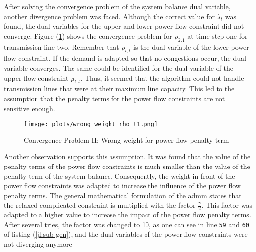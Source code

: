 After solving the convergence problem of the system balance dual variable, another divergence problem was faced. Although the correct value for $\lambda_t$ was found, the dual variables for the upper and lower power flow constraint did not converge. Figure (\ref{fig:conv-problem-2}) shows the convergence problem for $\rho_{2,1}$ at time step one for transmission line two. Remember that $\rho_{l,t}$ is the dual variable of the lower power flow constraint. If the demand is adapted so that no congestions occur, the dual variable converges. The same could be identified for the dual variable of the upper flow constraint $\mu_{l,t}$. Thus, it seemed that the algorithm could not handle transmission lines that were at their maximum line capacity. This led to the assumption that the penalty terms for the power flow constraints are not sensitive enough. \\

\begin{figure}[h!]
	\centering
	\texttt{[image: plots/wrong\_weight\_rho\_t1.png]}
	\caption{Convergence Problem II: Wrong weight for power flow penalty term}
	\label{fig:conv-problem-2}
\end{figure}

Another observation supports this assumption. It was found that the value of the penalty terms of the power flow constraints is much smaller than the value of the penalty term of the system balance. Consequently, the weight in front of the power flow constraints was adapted to increase the influence of the power flow penalty terms. The general mathematical formulation of the \gls{admm} states that the relaxed complicated constraint is multiplied with the factor $\frac{\gamma}{2}$. This factor was adapted to a higher value to increase the impact of the power flow penalty terms. After several tries, the factor was changed to 10, as one can see in line \texttt{59} and \texttt{60} of listing (\ref{jl:sub-gen}), and the dual variables of the power flow constraints were not diverging anymore. \\


